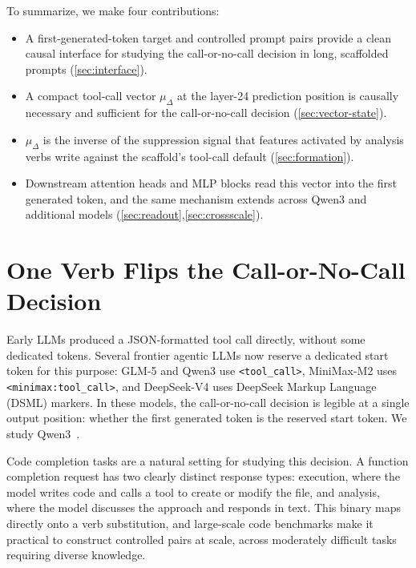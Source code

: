 \documentclass{article}
\begin{document}
To summarize, we make four contributions:

\begin{itemize}
  \item A first-generated-token target and controlled prompt pairs provide a clean causal interface for studying the call-or-no-call decision in long, scaffolded prompts (\autoref{sec:interface}).

  \item A compact tool-call vector $\mu_\Delta$ at the layer-24 prediction position is causally necessary and sufficient for the call-or-no-call decision (\autoref{sec:vector-state}).

  \item $\mu_\Delta$ is the inverse of the suppression signal that features activated by analysis verbs write against the scaffold's tool-call default (\autoref{sec:formation}).
  
  \item Downstream attention heads and MLP blocks read this vector into the first generated token, and the same mechanism extends across Qwen3 and additional models (\autoref{sec:readout},\autoref{sec:crossscale}).
\end{itemize}

\section{One Verb Flips the Call-or-No-Call Decision }
\label{sec:interface}

Early LLMs produced a JSON-formatted tool call directly, without some dedicated tokens.
Several frontier agentic LLMs now reserve a dedicated start token for this purpose: GLM-5 and Qwen3 use \texttt{<tool\_call>}, MiniMax-M2 uses \texttt{<minimax:tool\_call>}, and DeepSeek-V4 uses DeepSeek Markup Language (DSML) markers.
In these models, the call-or-no-call decision is legible at a single output position: whether the first generated token is the reserved start token.
We study Qwen3~\citep{yang2025qwen3}.

Code completion tasks are a natural setting for studying this decision.
A function completion request has two clearly distinct response types: execution, where the model writes code and calls a tool to create or modify the file, and analysis, where the model discusses the approach and responds in text.
This binary maps directly onto a verb substitution, and large-scale code benchmarks make it practical to construct controlled pairs at scale, across moderately difficult tasks requiring diverse knowledge.
\end{document}
